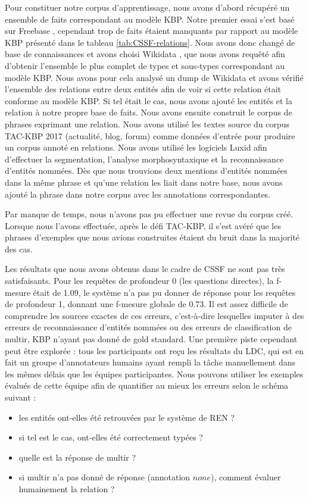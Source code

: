 \documentclass[12pt,a4paper,times,twoside,openright]{report}
\begin{document}
Pour constituer notre corpus d'apprentissage, nous avons d'abord récupéré un ensemble de faits correspondant au modèle KBP. Notre premier essai s'est basé sur Freebase \citep{bollacker2008freebase}, cependant trop de faits étaient manquants par rapport au modèle KBP présenté dans le tableau \ref{tab:CSSF-relations}. Nous avons donc changé de base de connaissances et avons choisi Wikidata \citep{vrandevcic2014wikidata}, que nous avons requêté afin d'obtenir l'ensemble le plus complet de types et sous-types correspondant au modèle KBP. Nous avons pour cela analysé un dump de Wikidata et avons vérifié l'ensemble des relations entre deux entités afin de voir si cette relation était conforme au modèle KBP. Si tel était le cas, nous avons ajouté les entités et la relation à notre propre base de faits. Nous avons ensuite construit le corpus de phrases exprimant une relation. Nous avons utilisé les textes source du corpus TAC-KBP 2017 (actualité, blog, forum) \citep{surdeanu2014overview} comme données d'entrée pour produire un corpus annoté en relations. Nous avons utilisé les logiciels Luxid afin d'effectuer la segmentation, l'analyse morphosyntaxique et la reconnaissance d'entités nommées. Dès que nous trouvions deux mentions d'entités nommées dans la même phrase et qu'une relation les liait dans notre base, nous avons ajouté la phrase dans notre corpus avec les annotations correspondantes.

Par manque de temps, nous n'avons pas pu effectuer une revue du corpus créé. Lorsque nous l'avons effectuée, après le défi TAC-KBP, il s'est avéré que les phrases d'exemples que nous avions construites étaient du bruit dans la majorité des cas.


Les résultats que nous avons obtenus dans le cadre de CSSF ne sont pas très satisfaisants. Pour les requêtes de profondeur 0 (les questions directes), la f-mesure était de 1.09, le système n'a pas pu donner de réponse pour les requêtes de profondeur 1, donnant une f-mesure globale de 0.73. Il est assez difficile de comprendre les sources exactes de ces erreurs, c'est-à-dire lesquelles imputer à des erreurs de reconnaissance d'entités nommées ou des erreurs de classification de multir, KBP n'ayant pas donné de gold standard. Une première piste cependant peut être explorée : tous les participants ont reçu les résultats du LDC, qui est en fait un groupe d'annotateurs humains ayant rempli la tâche manuellement dans les mêmes délais que les équipes participantes. Nous pouvons utiliser les exemples évalués de cette équipe afin de quantifier au mieux les erreurs selon le schéma suivant :
\begin{itemize}
    \item les entités ont-elles été retrouvées par le système de REN ?
    \item si tel est le cas, ont-elles été correctement typées ?
    \item quelle est la réponse de multir ?
    \item si multir n'a pas donné de réponse (annotation $none$), comment évaluer humainement la relation ?
\end{itemize}
\end{document}
